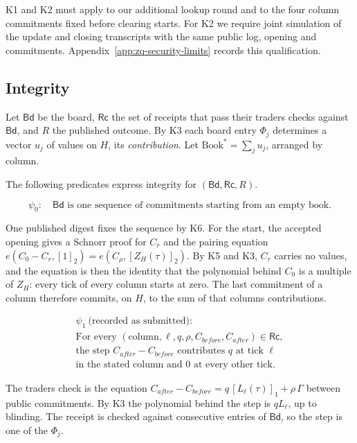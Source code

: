 K1 and K2 must apply to our additional lookup round and to the four column commitments fixed before clearing starts. For K2 we require joint simulation of the update and closing transcripts with the same public log, opening and commitments. Appendix~\ref{app:zq-security-limits} records this qualification.

\subsection{Integrity}

Let \(\mathsf{Bd}\) be the board, \(\mathsf{Rc}\) the set of receipts that pass their traders\textquotesingle{} checks against \(\mathsf{Bd}\), and \(R\) the published outcome. By K3 each board entry \(\Phi_j\) determines a vector \(u_j\) of values on \(H\), its \emph{contribution}. Let \(\text{Book}^* = \sum_j u_j\), arranged by column.

The following predicates express integrity for \((\mathsf{Bd},\mathsf{Rc},R)\).

\[\psi_0:\quad \mathsf{Bd} \text{ is one sequence of commitments starting from an empty book.}\]

One published digest fixes the sequence by K6. For the start, the accepted opening gives a Schnorr proof for \(C_r\) and the pairing equation \(e(C_0 - C_r, [1]_2) = e(C_\rho, [Z_H(\tau)]_2)\). By K5 and K3, \(C_r\) carries no values, and the equation is then the identity that the polynomial behind \(C_0\) is a multiple of \(Z_H\): every tick of every column starts at zero. The last commitment of a column therefore commits, on \(H\), to the sum of that column\textquotesingle s contributions.

\[
\begin{gathered}
\psi_1\ \text{(recorded as submitted)}: \\
\text{For every } (\text{column}, \ell, q, \rho, C_{before}, C_{after})
  \in \mathsf{Rc}, \\
\text{the step } C_{after} - C_{before} \text{ contributes } q
  \text{ at tick } \ell \\
\text{in the stated column and } 0 \text{ at every other tick.}
\end{gathered}
\]

The trader\textquotesingle s check is the equation \(C_{after} - C_{before} = q\,[L_\ell(\tau)]_1 + \rho\,\Gamma\) between public commitments. By K3 the polynomial behind the step is \(q L_\ell\), up to blinding. The receipt is checked against consecutive entries of \(\mathsf{Bd}\), so the step is one of the \(\Phi_j\).

